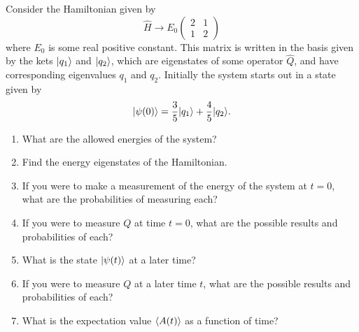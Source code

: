 \begin{problem}[Practice 1]
\label{prob_schro_practice1}

Consider the Hamiltonian given by
\[
\hat{H} \to E_0 \begin{pmatrix} 2 & 1 \\ 1 & 2 \end{pmatrix}
\]
where $E_0$ is some real positive constant.  This matrix is written in the basis given by the kets $| q_1 \rangle$ and $| q_2 \rangle$, which are eigenstates of some operator $\hat{Q}$, and have corresponding eigenvalues $q_1$ and $q_2$.    Initially the system starts out in a state given by
\[
| \psi(0) \rangle = \frac{3}{5} | q_1 \rangle + \frac{4}{5} | q_2 \rangle.
\]

\begin{enumerate}[label=(\alph*)]

\item What are the allowed energies of the system?

\item Find the energy eigenstates of the Hamiltonian.

\item If you were to make a measurement of the energy of the system at $t=0$, what are the probabilities of measuring each?

\item If you were to measure $Q$ at time $t = 0$, what are the possible results and probabilities of each?

\item What is the state $| \psi(t) \rangle$ at a later time?

\item If you were to measure $Q$ at a later time $t$, what are the possible results and probabilities of each?

\item What is the expectation value $\langle A(t) \rangle$ as a function of time?

\end{enumerate}

\end{problem}

\vspace{1in}


